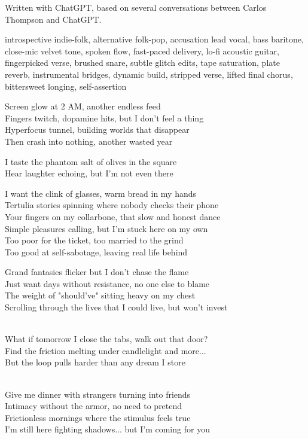 
\begin{notes}
Written with ChatGPT, based on several conversations between Carlos Thompson and ChatGPT.
\end{notes}
\begin{style}
introspective indie-folk, alternative folk-pop, accusation lead vocal, bass baritone, close-mic velvet tone, spoken flow, fast-paced delivery, lo-fi acoustic guitar, fingerpicked verse, brushed snare, subtle glitch edits, tape saturation, plate reverb, instrumental bridges, dynamic build, stripped verse, lifted final chorus, bittersweet longing, self-assertion
\end{style}
\begin{lyrics}
Screen glow at 2 AM, another endless feed\\
Fingers twitch, dopamine hits, but I don't feel a thing\\
Hyperfocus tunnel, building worlds that disappear\\
Then crash into nothing, another wasted year

I taste the phantom salt of olives in the square\\
Hear laughter echoing, but I'm not even there

I want the clink of glasses, warm bread in my hands\\
Tertulia stories spinning where nobody checks their phone\\
Your fingers on my collarbone, that slow and honest dance\\
Simple pleasures calling, but I'm stuck here on my own\\
Too poor for the ticket, too married to the grind\\
Too good at self-sabotage, leaving real life behind

Grand fantasies flicker but I don't chase the flame\\
Just want days without resistance, no one else to blame\\
The weight of "should've" sitting heavy on my chest\\
Scrolling through the lives that I could live, but won't invest

\\
What if tomorrow I close the tabs, walk out that door?\\
Find the friction melting under candlelight and more...\\
But the loop pulls harder than any dream I store

\\
Give me dinner with strangers turning into friends\\
Intimacy without the armor, no need to pretend\\
Frictionless mornings where the stimulus feels true\\
I'm still here fighting shadows... but I'm coming for you
\end{lyrics}

